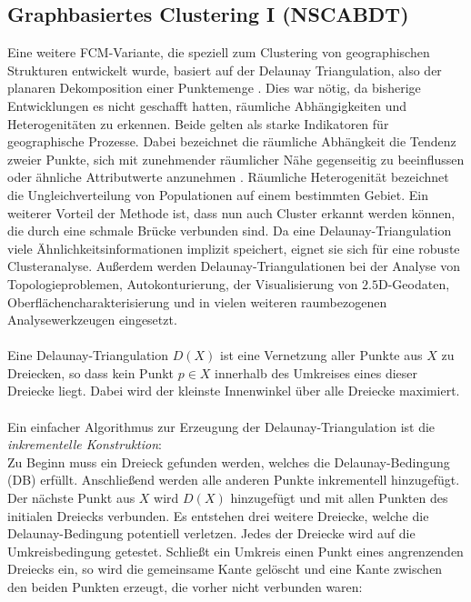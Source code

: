 \documentclass[11pt,ceqn]{book}
\begin{document}
\subsection{Graphbasiertes Clustering I (NSCABDT)}
Eine weitere FCM-Variante, die speziell zum Clustering von geographischen Strukturen entwickelt wurde, basiert auf der Delaunay Triangulation, also der planaren Dekomposition einer Punktemenge \cite{nscabdt}. Dies war nötig, da bisherige Entwicklungen es nicht geschafft hatten, räumliche Abhängigkeiten und Heterogenitäten zu erkennen. Beide gelten als starke Indikatoren für geographische Prozesse. Dabei bezeichnet die räumliche Abhängkeit die Tendenz zweier Punkte, sich mit zunehmender räumlicher Nähe gegenseitig zu beeinflussen oder ähnliche Attributwerte anzunehmen \cite{dependency}. Räumliche Heterogenität bezeichnet die Ungleichverteilung von Populationen auf einem bestimmten Gebiet. Ein weiterer Vorteil der Methode ist, dass nun auch Cluster erkannt werden können, die durch eine schmale Brücke verbunden sind. Da eine Delaunay-Triangulation viele Ähnlichkeitsinformationen implizit speichert, eignet sie sich für eine robuste Clusteranalyse. Außerdem werden Delaunay-Triangulationen bei der Analyse von Topologieproblemen, Autokonturierung, der Visualisierung von $2.5$D-Geodaten, Oberflächencharakterisierung und in vielen weiteren raumbezogenen Analysewerkzeugen eingesetzt.
\\~\\
Eine Delaunay-Triangulation $D(X)$ ist eine Vernetzung aller Punkte aus $X$ zu Dreiecken, so dass kein Punkt $p\in X$ innerhalb des Umkreises eines dieser Dreiecke liegt. Dabei wird der kleinste Innenwinkel über alle Dreiecke maximiert.
\\~\\
Ein einfacher Algorithmus zur Erzeugung der Delaunay-Triangulation ist die \textit{inkrementelle Konstruktion}:\\
Zu Beginn muss ein Dreieck gefunden werden, welches die Delaunay-Bedingung (DB) erfüllt. Anschließend werden alle anderen Punkte inkrementell hinzugefügt. Der nächste Punkt aus $X$ wird $D(X)$ hinzugefügt und mit allen Punkten des initialen Dreiecks verbunden. Es entstehen drei weitere Dreiecke, welche die Delaunay-Bedingung potentiell verletzen. Jedes der Dreiecke wird auf die Umkreisbedingung getestet. Schließt ein Umkreis einen Punkt eines angrenzenden Dreiecks ein, so wird die gemeinsame Kante gelöscht und eine Kante zwischen den beiden Punkten erzeugt, die vorher nicht verbunden waren:
\end{document}
